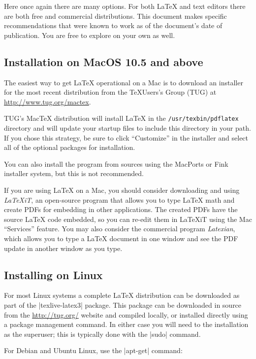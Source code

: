 Here once again there are many options. For both \LaTeX{} and text editors
there are both free  and commercial distributions. This document makes specific
recommendations that were known to work as of the document's date of
publication. You are free to explore on your own as well.

\subsection{Installation on MacOS 10.5 and above}

The easiest way to get \LaTeX{} operational on a Mac is to download an
installer for the most recent distribution from the \TeX Users's Group (TUG) at
\url{http://www.tug.org/mactex}. 

TUG's Mac\TeX{} distribution will install \LaTeX{} in the
\verb+/usr/texbin/pdflatex+ directory and will update your startup files to
include this directory in your path. If you chose this strategy, be sure to
click ``Customize'' in the installer and select  all of the optional packages
for installation.

You can also install the program from sources using the MacPorts or Fink
installer system, but this is not recommended. 

If you are using \LaTeX{} on a Mac, you should consider downloading and using
\emph{LaTeXiT}, an open-source program that allows you to type \LaTeX{} math
and create PDFs for embedding in other applications. The created PDFs have the
source \LaTeX{} code embedded, so you can re-edit them in LaTeXiT using the Mac
``Services'' feature.  You may also consider the commercial program
\emph{Latexian}, which allows you to type a \LaTeX{} document in one window and
see the PDF update in another window as you type.

\subsection{Installing on Linux}

For most Linux systems a complete \LaTeX{} distribution can be downloaded as
part of the |texlive-latex3| package. This package can be downloaded in source
from the \url{http://tug.org/} website and compiled locally, or installed
directly using a package management command. In either case you will need to
the installation as the superuser; this is typically done with the |sudo|
command.

For Debian and Ubuntu Linux, use the |apt-get| command:

